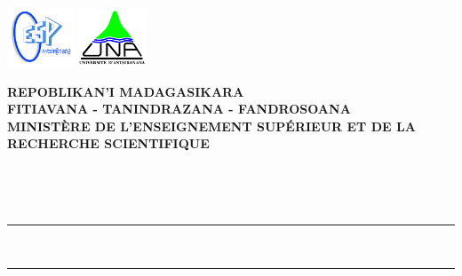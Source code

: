 \makeatletter
{}
  \begin{titlepage}
	\includegraphics[width=0.15\textwidth]{logo_espa}
	\hfill \includegraphics[width=0.15\textwidth]{logo_una}\\
	\parbox{9cm}{
	\begin{center}
	\vspace*{-30 mm}\large\textbf{REPOBLIKAN'I MADAGASIKARA}\\
	\small\textbf{FITIAVANA - TANINDRAZANA - FANDROSOANA}\\
	\vspace*{0.2 cm}
	\normalsize\textbf{MINISTÈRE DE L'ENSEIGNEMENT SUPÉRIEUR ET DE LA RECHERCHE SCIENTIFIQUE}\\
	\end{center}
	 }
	 \centering
	 \parbox{\textwidth}{
	\begin{center}
		\vspace*{4 mm} 
	 	\normalsize\large\textbf{\@ecole}
	\end{center}
	 }
\\
	\centering\parbox{\textwidth}{
		\begin{center}
		\large\textbf{\@departement} 
		\end{center}			
	}
\\
	\centering\parbox{\textwidth}{
		\begin{center}
		\color{black}\rule{\textwidth}{1.5pt}\\
		\vspace*{-0.42 cm}
		\rule{\textwidth}{0.5pt}\\
		\end{center}			
	}\\
	\vspace*{-0.7 cm}
	\centering\parbox{\textwidth}{
		\begin{center}
		\begin{normalsize}
		\color{black} 
		\textbf{\@typeRapport}

\end{normalsize}
\end{center}}
\end{titlepage}

